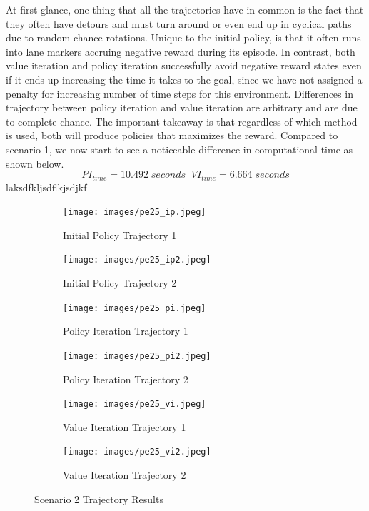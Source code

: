 \documentclass[fullpage]{article}
\begin{document}
At first glance, one thing that all the trajectories have in common is the fact that they often have detours and must turn around or even end up in cyclical paths due to random chance rotations. Unique to the initial policy, is that it often runs into lane markers accruing negative reward during its episode. In contrast, both value iteration and policy iteration successfully avoid negative reward states even if it ends up increasing the time it takes to the goal, since we have not assigned a penalty for increasing number of time steps for this environment. Differences in trajectory between policy iteration and value iteration are arbitrary and are due to complete chance. The important takeaway is that regardless of which method is used, both will produce policies that maximizes the reward. Compared to scenario 1, we now start to see a noticeable difference in computational time as shown below.
\[
PI_{time} = 10.492 \; seconds \; \; VI_{time} = 6.664 \; seconds
\]
laksdfkljsdflkjsdjkf

\begin{figure}[H]
\begin{subfigure}{.5\textwidth}
\centering
\texttt{[image: images/pe25\_ip.jpeg]}
\caption{Initial Policy Trajectory 1}
\label{fig:1a}
\end{subfigure}
\begin{subfigure}{.5\textwidth}
\centering
\texttt{[image: images/pe25\_ip2.jpeg]}
\caption{Initial Policy Trajectory 2}
\label{fig:1b}
\end{subfigure}
\begin{subfigure}{.5\textwidth}
\centering
\texttt{[image: images/pe25\_pi.jpeg]}
\caption{Policy Iteration Trajectory 1}
\label{fig:2a}
\end{subfigure}
\begin{subfigure}{.5\textwidth}
\centering
\texttt{[image: images/pe25\_pi2.jpeg]}
\caption{Policy Iteration Trajectory 2}
\label{fig:2b}
\end{subfigure}
\begin{subfigure}{.5\textwidth}
\centering
\texttt{[image: images/pe25\_vi.jpeg]}
\caption{Value Iteration Trajectory 1}
\label{fig:3a}
\end{subfigure}
\begin{subfigure}{.5\textwidth}
\centering
\texttt{[image: images/pe25\_vi2.jpeg]}
\caption{Value Iteration Trajectory 2}
\label{fig:3b}
\end{subfigure}
\caption{Scenario 2 Trajectory Results}
\end{figure}
\end{document}
